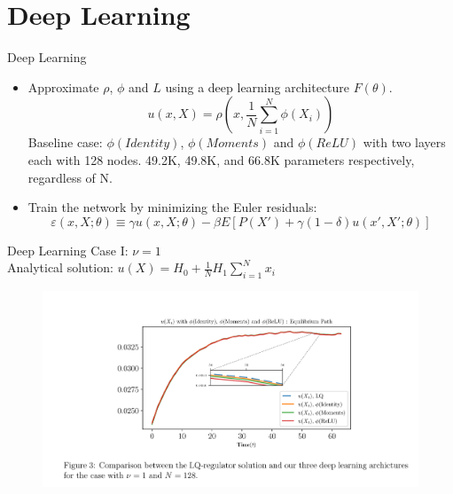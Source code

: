 \documentclass[dvipsnames,mathserif]{beamer}
\begin{document}
{\section{Deep Learning}
\begin{frame}{Deep Learning}
    \begin{itemize}
        \item Approximate $\rho$, $\phi$ and $L$ using a deep learning architecture $F(\theta)$.
        \[u(x,X) = \rho(x,\frac{1}{N}\sum_{i=1}^{N}\phi(X_i))\]
        Baseline case: $\phi(Identity)$, $\phi(Moments)$ and $\phi(ReLU)$ with two layers each with 128 nodes. 49.2K, 49.8K, and 66.8K parameters respectively, regardless of N.
        \vspace{0.1cm}
        \item Train the network by minimizing the Euler residuals:
        \[\varepsilon(x,X;\theta) \equiv \gamma u(x,X;\theta) - \beta E[P(X') + \gamma (1-\delta)u(x',X';\theta)]\]
    \end{itemize}
\end{frame}



\begin{frame}{Deep Learning}
Case I: $\nu = 1$\\
Analytical solution: $u(X) = H_0 + \frac{1}{N}H_1\sum_{i=1}^{N}x_i$
\begin{figure}[h!]
\centering
\includegraphics[width = 1.1\textwidth]{3.png}
\end{figure}
\end{frame}

}
\end{document}
